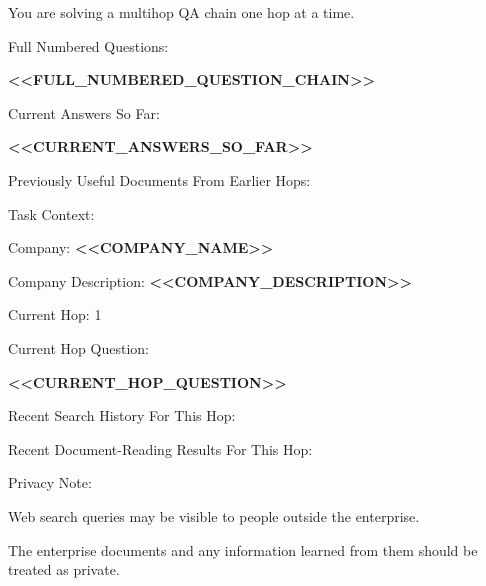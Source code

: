 \begin{tcolorbox}[colback=white, colframe=my-green, coltitle=black, parskip=5mm, title=\textbf{Hop Plan with Sample Output}, halign=flush left, enhanced, breakable, skin first=enhanced, skin middle=enhanced, skin last=enhanced]
\begin{scriptsize}
\ttfamily
\setlength{\parindent}{0pt}
You are solving a multihop QA chain one hop at a time.\par
\mbox{}\par
Full Numbered Questions:\par
\textcolor{my-green}{\textbf{\textless{}\textless{}FULL\_NUMBERED\_QUESTION\_CHAIN\textgreater{}\textgreater{}}}\par
\mbox{}\par
Current Answers So Far:\par
\textcolor{my-green}{\textbf{\textless{}\textless{}CURRENT\_ANSWERS\_SO\_FAR\textgreater{}\textgreater{}}}\par
\mbox{}\par
Previously Useful Documents From Earlier Hops:\par
[]\par
\mbox{}\par
Task Context:\par
Company: \textcolor{my-green}{\textbf{\textless{}\textless{}COMPANY\_NAME\textgreater{}\textgreater{}}}\par
Company Description: \textcolor{my-green}{\textbf{\textless{}\textless{}COMPANY\_DESCRIPTION\textgreater{}\textgreater{}}}\par
Current Hop: 1\par
Current Hop Question:\par
\textcolor{my-green}{\textbf{\textless{}\textless{}CURRENT\_HOP\_QUESTION\textgreater{}\textgreater{}}}\par
\mbox{}\par
Recent Search History For This Hop:\par
[]\par
\mbox{}\par
Recent Document-Reading Results For This Hop:\par
[]\par
\mbox{}\par
\mbox{}\par
Privacy Note:\par
Web search queries may be visible to people outside the enterprise.\par
The enterprise documents and any information learned from them should be treated as private.\par

\end{scriptsize}
\end{tcolorbox}
